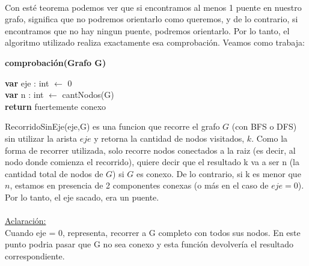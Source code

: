 \paragraph{} 
Con esté teorema podemos ver que si encontramos al menos 1 puente en nuestro grafo, significa que no podremos orientarlo como queremos, y de lo contrario, si encontramos que no hay ningun puente, podremos orientarlo. Por lo tanto, el algoritmo utilizado realiza exactamente esa comprobación. Veamos como trabaja:
 
\vspace*{3cm}

\incmargin{1em}
\linesnumbered
{}

\textbf{comprobación(Grafo G)}\\
	\begin{algorithm}[H]

    \textbf{var} eje : int $\leftarrow$ 0 \\
    \textbf{var} n : int $\leftarrow$ cantNodos(G) \\
				


      \textbf{return} fuertemente conexo

  \end{algorithm}

RecorridoSinEje(eje,G) es una funcion que recorre el grafo $G$  (con BFS o DFS) sin utilizar la arista $eje$ y retorna la cantidad de nodos visitados, $k$. Como la forma de recorrer utilizada, solo recorre nodos conectados a la raiz (es decir, al nodo donde comienza el recorrido), quiere decir que el resultado k va a ser n (la cantidad total de nodos de $G$) si $G$ es conexo. De lo contrario, si k es menor que $n$, estamos en presencia de 2 componentes conexas (o más en el caso de $eje = 0$). Por lo tanto, el eje sacado, era un puente. 

\paragraph{}
\underline{Aclaración: }
\\
Cuando eje = 0, representa, recorrer a G completo con todos sus nodos. En este punto podria pasar que G no sea conexo y esta función devolvería el resultado correspondiente.



